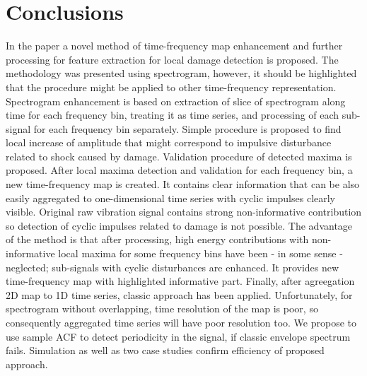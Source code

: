 \documentclass[3p,times]{elsarticle}
\begin{document}
\section{Conclusions}
In the paper a novel method of time-frequency map enhancement and further processing for feature extraction for local damage detection is proposed. The methodology was presented using spectrogram, however, it should be highlighted that the procedure might be applied to other time-frequency representation. Spectrogram enhancement is based on extraction of slice of spectrogram along time for each frequency bin, treating it as time series, and processing of each sub-signal for each frequency bin separately. Simple procedure is proposed to find local increase of amplitude that might correspond to impulsive disturbance related to shock caused by damage. Validation procedure of detected maxima is proposed. After local maxima detection and validation for each frequency bin, a new time-frequency map is created. It contains clear information that can be also easily aggregated to one-dimensional time series with cyclic impulses clearly visible. Original raw vibration signal contains strong non-informative contribution so detection of cyclic impulses related to damage is not possible. The advantage of the method is that after processing, high energy contributions with non-informative local maxima for some frequency bins have been - in some sense - neglected; sub-signals with cyclic disturbances are enhanced. It provides new time-frequency map with highlighted informative part. Finally, after agreegation 2D map to 1D time series, classic approach has been applied. Unfortunately, for spectrogram without overlapping, time resolution of the map is poor, so consequently aggregated time series will have poor resolution too. We propose to use sample ACF to detect periodicity in the signal, if classic envelope spectrum fails. Simulation as well as two case studies confirm efficiency of proposed approach.
\end{document}
